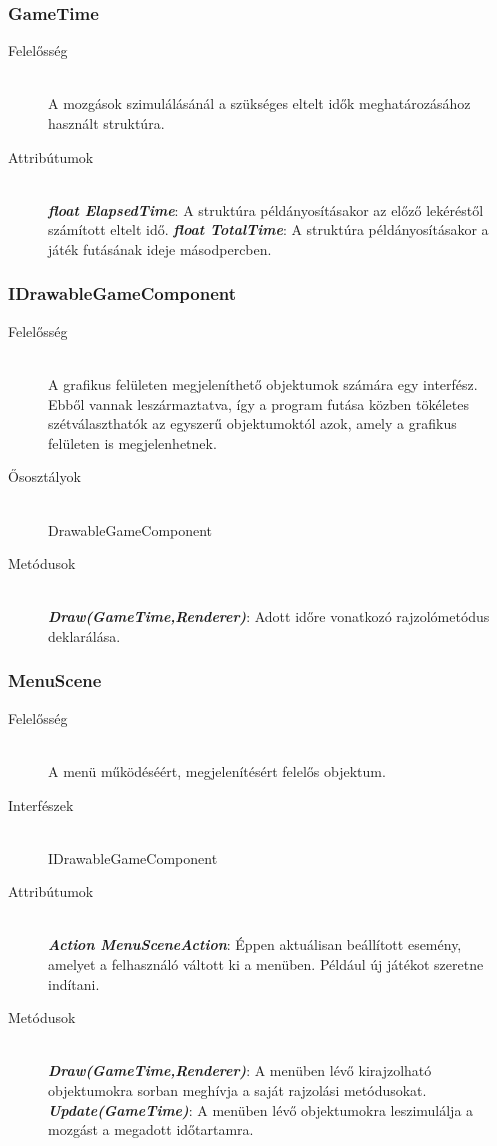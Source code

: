 \subsubsection{GameTime}
	\begin{description}
		\item[Felelősség] \hfill \\
		A mozgások szimulálásánál a szükséges eltelt idők meghatározásához használt struktúra.
		\item[Attribútumok]\hfill \\
		\textbf{\emph{float ElapsedTime}}: A struktúra példányosításakor az előző lekéréstől számított eltelt idő.
		\textbf{\emph{float TotalTime}}: A struktúra példányosításakor a játék futásának ideje másodpercben.
	\end{description}
	
\subsubsection{IDrawableGameComponent}
	\begin{description}
		\item[Felelősség] \hfill \\
		A grafikus felületen megjeleníthető	objektumok számára egy interfész. Ebből vannak leszármaztatva, így a program futása közben tökéletes szétválaszthatók az egyszerű objektumoktól azok, amely a grafikus felületen is megjelenhetnek.
		\item[Ősosztályok] \hfill \\
		DrawableGameComponent
		\item[Metódusok]\hfill \\
		\textbf{\emph{Draw(GameTime,Renderer)}}: Adott időre vonatkozó rajzolómetódus deklarálása. 
	\end{description}

\subsubsection{MenuScene}
	\begin{description}
		\item[Felelősség] \hfill \\
		A menü működéséért, megjelenítésért felelős objektum.
		\item[Interfészek]\hfill \\
		IDrawableGameComponent
		\item[Attribútumok]\hfill \\
		\textbf{\emph{Action MenuSceneAction}}: Éppen aktuálisan beállított esemény, amelyet a felhasználó váltott ki a menüben. Például új játékot szeretne indítani.
		\item[Metódusok]\hfill \\
		\textbf{\emph{Draw(GameTime,Renderer)}}: A menüben lévő kirajzolható objektumokra sorban meghívja a saját rajzolási metódusokat.
		\textbf{\emph{Update(GameTime)}}: A menüben lévő objektumokra leszimulálja a mozgást a megadott időtartamra.
	\end{description}


